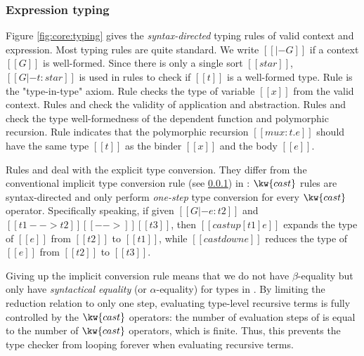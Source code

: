 \subsubsection{Expression typing}
Figure \ref{fig:core:typing} gives the \emph{syntax-directed} typing rules of valid context and expression. Most typing rules are quite standard. We write $[[|- G]]$ if a context $[[G]]$ is well-formed. Since there is only a single sort $[[star]]$, $[[G |- t : star]]$ is used in rules to check if $[[t]]$ is a well-formed type. Rule  is the "type-in-type" axiom. Rule  checks the type of variable $[[x]]$ from the valid context. Rules  and  check the validity of application and abstraction. Rules  and  check the type well-formedness of the dependent function and polymorphic recursion. Rule  indicates that the polymorphic recursion $[[mu x:t.e]]$ should have the same type $[[t]]$ as the binder $[[x]]$ and the body $[[e]]$.

Rules  and  deal with the explicit type conversion. They differ from the conventional implicit type conversion rule (see \ref{}) in \cc: $\kw{cast}$ rules are syntax-directed and only perform \emph{one-step} type conversion for every $\kw{cast}$ operator. Specifically speaking, if given $[[G |- e : t2]]$ and $[[t1 --> t2]] [[-->]] [[t3]]$, then $[[castup [t1] e]]$ expands the type of $[[e]]$ from $[[t2]]$ to $[[t1]]$, while $[[castdown e]]$ reduces the type of $[[e]]$ from $[[t2]]$ to $[[t3]]$. 

Giving up the implicit conversion rule means that we do not have $\beta$-equality but only have \emph{syntactical equality} (or $\alpha$-equality) for types in \name. By limiting the reduction relation to only one step, evaluating type-level recursive terms is fully controlled by the $\kw{cast}$ operators: the number of evaluation steps of is equal to the number of $\kw{cast}$ operators, which is finite. Thus, this prevents the type checker from looping forever when evaluating recursive terms.

